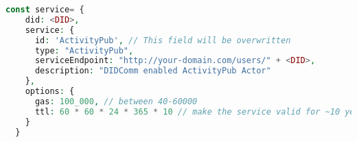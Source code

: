 \lstset{style=JSONStyle}
\begin{lstlisting}[language=PHP, caption=Parameters to add a service in Veramo, label=fig:service_object, float=h]
  const service= {
    did: <DID>,
    service: {
      id: 'ActivityPub', // This field will be overwritten
      type: "ActivityPub",
      serviceEndpoint: "http://your-domain.com/users/" + <DID>,
      description: "DIDComm enabled ActivityPub Actor"
    },
    options: {
      gas: 100_000, // between 40-60000
      ttl: 60 * 60 * 24 * 365 * 10 // make the service valid for ~10 years
    }
  }
\end{lstlisting}





